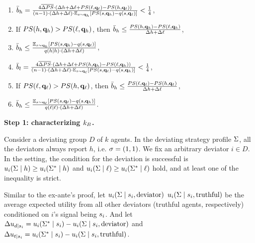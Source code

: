 \begin{enumerate}
    \item $\bar{b}_h = \frac{4\overline{\Delta PS}\cdot (\Delta h + \Delta \ell + PS(\ell, \mathbf{q}_{\ell}) - PS(h, \mathbf{q}_\ell))}{ (n - 1)\cdot (\Delta h +\Delta \ell)\cdot  \mathbb{E}_{s \sim \mathbf{q}_h}[PS(s, \mathbf{q}_h) - q(s, \mathbf{q}_\ell)]} < \frac14$, 
    \item If $PS(h, \mathbf{q}_h) > PS(\ell, \mathbf{q}_h)$, then $\bar{b}_h \le \frac{PS(h, \mathbf{q}_h) - PS(\ell, \mathbf{q}_h)}{\Delta h + \Delta \ell}$, 
    \item $\bar{b}_h \le \frac{\mathbb{E}_{s \sim \mathbf{q}_h}[PS(s, \mathbf{q}_h) - q(s, \mathbf{q}_\ell)]}{q(h\mid h)\cdot (\Delta h + \Delta \ell)}$,
    \item $\bar{b}_l = \frac{4\overline{\Delta PS}\cdot (\Delta h + \Delta \ell + PS(h, \mathbf{q}_{h}) - PS(\ell, \mathbf{q}_h))}{ (n - 1)\cdot (\Delta h +\Delta \ell)\cdot  \mathbb{E}_{s \sim \mathbf{q}_\ell}[PS(s, \mathbf{q}_\ell) - q(s, \mathbf{q}_h)]} < \frac14$, 
    \item If $PS(\ell, \mathbf{q}_{\ell}) > PS(h, \mathbf{q}_\ell)$, then $\bar{b}_h \le \frac{PS(\ell, \mathbf{q}_{\ell}) - PS(h, \mathbf{q}_\ell)}{\Delta h + \Delta \ell}$, 
    \item $\bar{b}_h \le \frac{\mathbb{E}_{s \sim \mathbf{q}_\ell}[PS(s, \mathbf{q}_\ell) - q(s, \mathbf{q}_h)]}{q(\ell \mid \ell)\cdot (\Delta h + \Delta \ell)}$.
\end{enumerate}

    \noindent\textbf{Step 1: characterizing $k_B$.}
    
    Consider a deviating group $D$ of $k$ agents. In the deviating strategy profile $\Sigma$, all the deviators always report $h$, i.e. $\sigma = (1, 1)$. We fix an arbitrary deviator $i \in D$. In the \qi{} setting, the condition for the deviation is successful is $u_i(\Sigma\mid h) \ge u_i(\Sigma^*\mid h)$ and $u_i(\Sigma\mid \ell) \ge u_i(\Sigma^*\mid \ell)$ hold, and at least one of the inequality is strict. 

    Similar to the ex-ante's proof, let $u_i(\Sigma\mid s_i, \text{deviator})$ $u_i(\Sigma\mid s_i, \text{truthful})$ be the average expected utility from all other deviators (truthful agents, respectively) conditioned on $i$'s signal being $s_i$. And let $\Delta u_{d\mid s_i} = u_i(\Sigma^* \mid s_i) - u_i(\Sigma\mid s_i, \text{deviator})$ and $\Delta u_{t\mid s_i} = u_i(\Sigma^* \mid s_i) - u_i(\Sigma\mid s_i, \text{truthful})$. 

